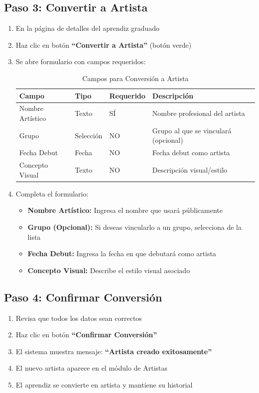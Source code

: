 \documentclass[12pt,a4paper,spanish,oneside]{report}
\begin{document}
\subsection{Paso 3: Convertir a Artista}

\begin{enumerate}
\item En la página de detalles del aprendiz graduado
\item Haz clic en botón \textbf{``Convertir a Artista''} (botón verde)
\item Se abre formulario con campos requeridos:

\begin{table}[H]
\centering
\caption{Campos para Conversión a Artista}
\begin{tabular}{|l|l|l|l|}
\hline
\textbf{Campo} & \textbf{Tipo} & \textbf{Requerido} & \textbf{Descripción} \\
\hline
Nombre Artístico & Texto & SÍ & Nombre profesional del artista \\
\hline
Grupo & Selección & NO & Grupo al que se vinculará (opcional) \\
\hline
Fecha Debut & Fecha & NO & Fecha debut como artista \\
\hline
Concepto Visual & Texto & NO & Descripción visual/estilo \\
\hline
\end{tabular}
\end{table}

\item Completa el formulario:
\begin{itemize}
\item \textbf{Nombre Artístico:} Ingresa el nombre que usará públicamente
\item \textbf{Grupo (Opcional):} Si deseas vincularlo a un grupo, selecciona de la lista
\item \textbf{Fecha Debut:} Ingresa la fecha en que debutará como artista
\item \textbf{Concepto Visual:} Describe el estilo visual asociado
\end{itemize}
\end{enumerate}

\subsection{Paso 4: Confirmar Conversión}

\begin{enumerate}
\item Revisa que todos los datos sean correctos
\item Haz clic en botón \textbf{``Confirmar Conversión''}
\item El sistema muestra mensaje: \textbf{``Artista creado exitosamente''}
\item El nuevo artista aparece en el módulo de Artistas
\item El aprendiz se convierte en artista y mantiene su historial
\end{enumerate}
\end{document}
